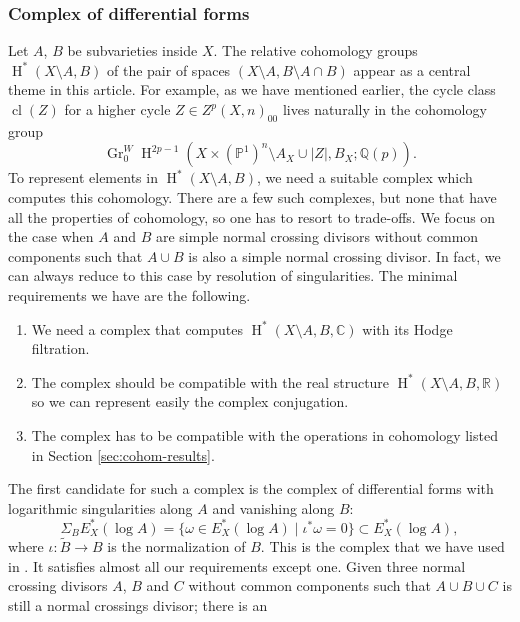 \documentclass[11pt,a4paper]{amsart}
\newcommand{\C}{\mathds{C}}
\renewcommand{\P}{\mathds{P}}
\newcommand{\Q}{\mathds{Q}}
\newcommand{\R}{\mathds{R}}
\DeclareMathOperator {\Gr} {Gr}
\DeclareMathOperator {\cl}{cl}
\DeclareMathOperator{\rH}{H}
\numberwithin{equation}{section}
\theoremstyle{plain}
\theoremstyle{definition}
\begin{document}
\subsubsection*{Complex of differential forms}\label{int-subsec-complex}
Let $A$, $B$ be subvarieties inside $X$. The relative cohomology
groups $\rH^{\ast}(X\setminus A, B)$ of the pair of spaces
$(X\setminus A, B\setminus A\cap B)$ appear as a central theme in
this article. For example, as we have mentioned earlier, the
cycle class $\cl(Z)$ for a higher cycle
$Z\in Z^{p}(X,n)_{00}$ lives naturally in the cohomology group
\begin{displaymath}
\Gr^{W}_{0}\rH^{2p-1}(X\times (\P^1)^{n}\setminus A_{X}\cup |Z|, B_{X};\Q(p)).
\end{displaymath}
To represent elements in $\rH^{\ast}(X\setminus A, B)$, we need a
suitable complex which computes this
cohomology. There are a few such complexes, but none that have
all the properties of cohomology, so one has to resort to trade-offs.
We focus on the case when $A$ and $B$ are simple normal crossing
divisors without common components such that $A\cup B$ is also a
simple normal crossing divisor. In fact, we can always reduce to this case by
resolution of singularities. The minimal requirements we have are the
following.
\begin{enumerate}
\item We need a complex that computes $\rH^{\ast}(X\setminus A, B,\C)$
  with its Hodge filtration.
\item The complex should be compatible with the real structure
  $\rH^{\ast}(X\setminus A, B,\R)$ so we can represent easily the complex
  conjugation. 
\item The complex has to be compatible with the operations in
  cohomology listed in Section \ref{sec:cohom-results}. 
\end{enumerate}
The first candidate for such a complex is the complex of differential
forms with logarithmic singularities along $A$ and vanishing along
$B$:
\begin{displaymath}
  \Sigma _{B}E^{\ast}_{X}(\log A)=
  \{\omega \in E^{\ast}_{X}(\log A)\mid
  \iota ^{\ast} \omega =0\}
  \subset E^{\ast}_{X}(\log A),
\end{displaymath}
where $\iota\colon \widetilde{B}\rightarrow B$ is the normalization of
$B$. This is the complex that we have used in \cite{BGGP:Height}. It
satisfies almost all our requirements except one. Given three normal
crossing divisors $A$, $B$ and $C$ without common components such that
$A\cup B\cup C$ is still a normal crossings divisor; there is an
\end{document}
